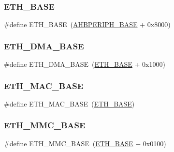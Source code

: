 \subsubsection{\texorpdfstring{ETH\_BASE}{ETH\_BASE}}
{\footnotesize\ttfamily \#define E\+T\+H\+\_\+\+B\+A\+SE~(\mbox{\hyperlink{group___peripheral__memory__map_ga92eb5d49730765d2abd0f5b09548f9f5}{A\+H\+B\+P\+E\+R\+I\+P\+H\+\_\+\+B\+A\+SE}} + 0x8000)}

\mbox{\label{group___peripheral__memory__map_gace2114e1b37c1ba88d60f3e831b67e93}} 
\subsubsection{\texorpdfstring{ETH\_DMA\_BASE}{ETH\_DMA\_BASE}}
{\footnotesize\ttfamily \#define E\+T\+H\+\_\+\+D\+M\+A\+\_\+\+B\+A\+SE~(\mbox{\hyperlink{group___peripheral__memory__map_gad965a7b1106ece575ed3da10c45c65cc}{E\+T\+H\+\_\+\+B\+A\+SE}} + 0x1000)}

\mbox{\label{group___peripheral__memory__map_ga3cf7005808feb61bff1fee01e50a711a}} 
\subsubsection{\texorpdfstring{ETH\_MAC\_BASE}{ETH\_MAC\_BASE}}
{\footnotesize\ttfamily \#define E\+T\+H\+\_\+\+M\+A\+C\+\_\+\+B\+A\+SE~(\mbox{\hyperlink{group___peripheral__memory__map_gad965a7b1106ece575ed3da10c45c65cc}{E\+T\+H\+\_\+\+B\+A\+SE}})}

\mbox{\label{group___peripheral__memory__map_ga4946f2b3b03f7998343ac1778fbcf725}} 
\subsubsection{\texorpdfstring{ETH\_MMC\_BASE}{ETH\_MMC\_BASE}}
{\footnotesize\ttfamily \#define E\+T\+H\+\_\+\+M\+M\+C\+\_\+\+B\+A\+SE~(\mbox{\hyperlink{group___peripheral__memory__map_gad965a7b1106ece575ed3da10c45c65cc}{E\+T\+H\+\_\+\+B\+A\+SE}} + 0x0100)}

